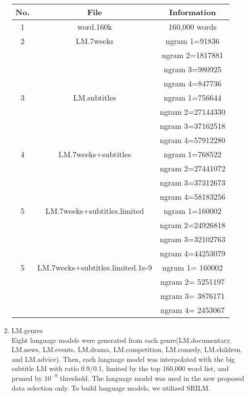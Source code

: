 \begin{enumerate}
\begin{center}
\begin{tabular}{ | c | c | c | }
\hline
\textbf{No.} & \textbf{File}  & \textbf{Information} \\ \hline \hline
1 & word.160k & 160,000 words \\  \hline
2 & LM.7weeks & ngram 1=91836 \\
 & & ngram 2=1817881 \\
 & & ngram 3=980925 \\
 & & ngram 4=847736 \\  \hline
3 & LM.subtitles & ngram 1=756644 \\
 & & ngram 2=27144330 \\
 & & ngram 3=37162518 \\
 & & ngram 4=57912280 \\ \hline
4 & LM.7weeks+subtitles & ngram 1=768522 \\
 & & ngram 2=27441072 \\
 & & ngram 3=37312673 \\
 & & ngram 4=58183256 \\ \hline
5 & LM.7weeks+subtitles.limited & ngram 1=160002 \\
 & & ngram 2=24926818 \\
 & & ngram 3=32102763 \\
 & & ngram 4=44253079 \\ \hline
5 & LM.7weeks+subtitles.limited.1e-9 &ngram  1= 160002 \\
 & & ngram  2=   5251197 \\
 & & ngram  3=   3876171 \\
 & & ngram  4=   2453067 \\ \hline
\end{tabular}
\end{center}

\item LM.genres \\
Eight language models were generated from each genre(LM.documentary, LM.news, LM.events, LM.drama, LM.competition, LM.comedy, LM.children, and LM.advice). Then, each language model was interpolated with the big subtitle LM with  ratio 0.9/0.1, limited by the top 160,000 word list, and pruned by $10^{-9}$ threshold. The language model was used in the new proposed data selection only. To build language models, we utilized SRILM.


\end{enumerate}
